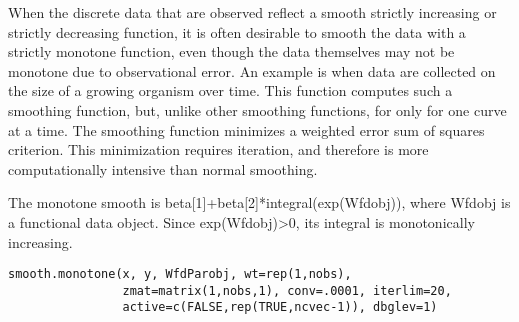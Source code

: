 \begin{Description}\relax
When the discrete data that are observed reflect a smooth strictly
increasing or strictly decreasing function, it is often desirable to
smooth the data with a strictly monotone function, even though the
data themselves may not be monotone due to observational error.  An
example is when data are collected on the size of a growing organism
over time.  This function computes such a smoothing function, but,
unlike other smoothing functions, for only for one curve at a time.
The smoothing function minimizes a weighted error sum of squares
criterion.  This minimization requires iteration, and therefore is
more computationally intensive than normal smoothing.

The monotone smooth is beta[1]+beta[2]*integral(exp(Wfdobj)), where
Wfdobj is a functional data object.  Since exp(Wfdobj)>0, its integral
is monotonically increasing.
\end{Description}
\begin{Usage}
\begin{verbatim}
smooth.monotone(x, y, WfdParobj, wt=rep(1,nobs),
                zmat=matrix(1,nobs,1), conv=.0001, iterlim=20,
                active=c(FALSE,rep(TRUE,ncvec-1)), dbglev=1)
\end{verbatim}
\end{Usage}
